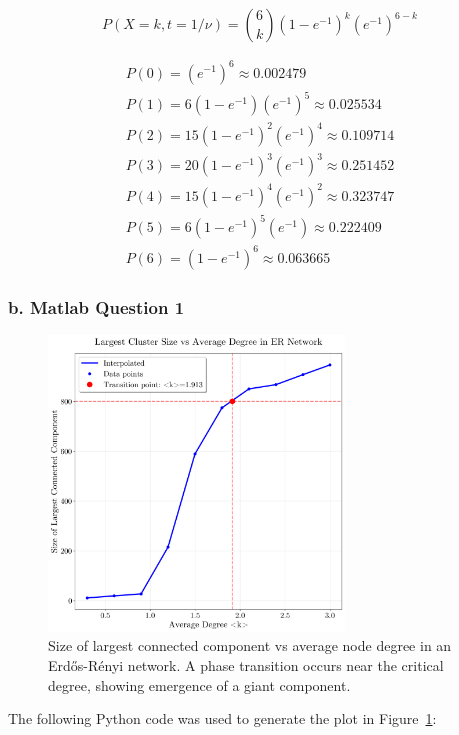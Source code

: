 \documentclass{article}
\begin{document}
\begin{equation}
    \boxed{P(X = k, t = 1/\nu) = \binom{6}{k} {(1-e^{-1})}^k {(e^{-1})}^{6-k}}
\end{equation}

\begin{align*}
    P(0) = {(e^{-1})}^6 \approx 0.002479                 \\
    P(1) = 6(1-e^{-1}){(e^{-1})}^5 \approx 0.025534      \\
    P(2) = 15{(1-e^{-1})}^2{(e^{-1})}^4 \approx 0.109714 \\
    P(3) = 20{(1-e^{-1})}^3{(e^{-1})}^3 \approx 0.251452 \\
    P(4) = 15{(1-e^{-1})}^4{(e^{-1})}^2 \approx 0.323747 \\
    P(5) = 6{(1-e^{-1})}^5{(e^{-1})} \approx 0.222409    \\
    P(6) = {(1-e^{-1})}^6 \approx 0.063665
\end{align*}

\newpage
\subsubsection*{b. Matlab Question 1}

\begin{figure}[htbp]
    \centering
    \includegraphics[width=0.7\textwidth]{figures/3b.png}
    \caption{\centering Size of largest connected component vs average node degree in an Erdős-Rényi network. A phase transition occurs near the critical degree, showing emergence of a giant component.}\label{fig:3b}
\end{figure}

The following Python code was used to generate the plot in Figure~\ref{fig:3b}:
\end{document}
